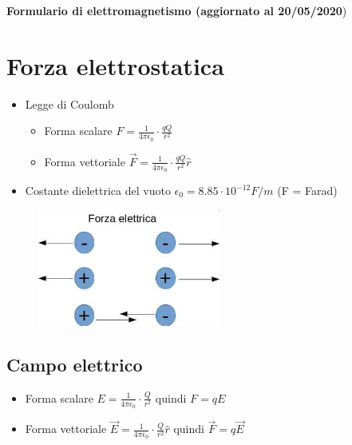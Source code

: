 \documentclass[17pt]{article}
\begin{document}
\begin{center}
	{\bf Formulario di elettromagnetismo (aggiornato al 20/05/2020})
\end{center}


\section{Forza elettrostatica}


\begin{itemize}
	\item Legge di Coulomb         
		\begin{itemize}
			\item Forma scalare $F = \frac{1}{4\pi\epsilon_0}\cdot\frac{qQ}{r^2}$
			\item Forma vettoriale $\vec{F} = \frac{1}{4\pi\epsilon_0}\cdot\frac{qQ}{r^2}\hat{r}$
		\end{itemize}			
	  
	\item Costante dielettrica del vuoto        $\epsilon_0 = 8.85\cdot 10^{-12}F/m$   (F = Farad)
\end{itemize}



\begin{figure}[th]
\includegraphics[width=6cm]{forzaElettrica.jpg}%
\centering
\end{figure}






\subsection{Campo elettrico}

      
\begin{itemize}
	\item Forma scalare $E = \frac{1}{4\pi\epsilon_0}\cdot\frac{Q}{r^2}$ quindi $F = qE$
	\item Forma vettoriale $\vec{E} = \frac{1}{4\pi\epsilon_0}\cdot\frac{Q}{r^2}\hat{r}$ quindi $\vec{F} = q\vec{E}$
\end{itemize}			
\end{document}
